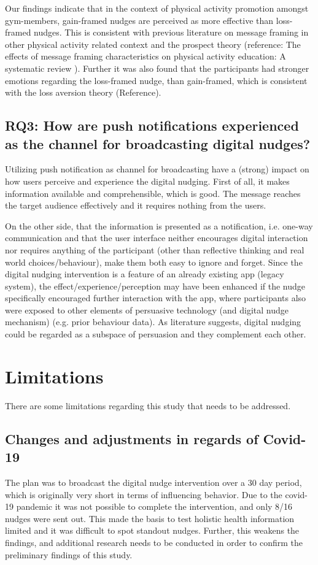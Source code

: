 Our findings indicate that in the context of physical activity promotion amongst gym-members, gain-framed nudges are perceived as more effective than loss-framed nudges. This is consistent with previous literature on message framing in other physical activity related context and the prospect theory (reference: The effects of message framing characteristics on physical activity education: A systematic review ). Further it was also found that the participants had stronger emotions regarding the loss-framed nudge, than gain-framed, which is consistent with the loss aversion theory (Reference). 

\subsection{RQ3: How are push notifications experienced as the channel for broadcasting digital nudges?}
Utilizing push notification as channel for broadcasting have a (strong) impact on how users perceive and experience the digital nudging. First of all, it makes information available and comprehensible, which is good. The message reaches the target audience effectively and it requires nothing from the users.

On the other side, that the information is presented as a notification, i.e. one-way communication and that the user interface neither encourages digital interaction nor requires anything of the participant (other than reflective thinking and real world choices/behaviour), make them both easy to ignore and forget. Since the digital nudging intervention is a feature of an already existing app (legacy system), the effect/experience/perception may have been enhanced if the nudge specifically encouraged further interaction with the app, where participants also were exposed to other elements of persuasive technology (and digital nudge mechanism) (e.g. prior behaviour data). As literature suggests, digital nudging could be regarded as a subspace of persuasion and they complement each other.  

\section{Limitations}
There are some limitations regarding this study that needs to be addressed.

\subsection{Changes and adjustments in regards of Covid-19 }
The plan was to broadcast the digital nudge intervention over a 30 day period, which is originally very short in terms of influencing behavior. Due to the covid-19 pandemic it was not possible to complete the intervention, and only 8/16 nudges were sent out. This made the basis to test holistic health information limited and it was difficult to spot standout nudges. Further, this weakens the findings, and additional research needs to be conducted in order to confirm the preliminary findings of this study. 

